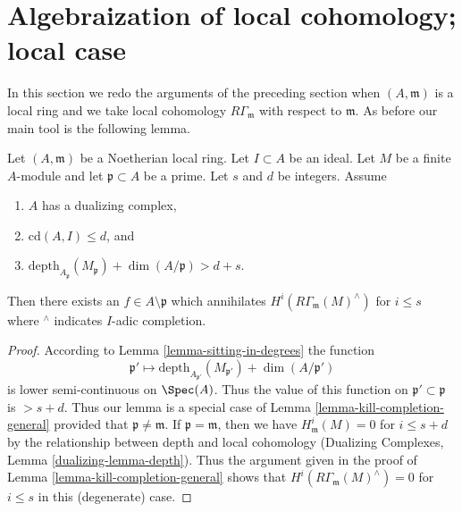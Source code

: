 \section{Algebraization of local cohomology; local case}
\label{section-algebraization-punctured}

\noindent
In this section we redo the arguments of the preceding section
when $(A, \mathfrak m)$ is a local ring and we take local cohomology
$R\Gamma_\mathfrak m$ with respect to $\mathfrak m$. As before our
main tool is the following lemma.

\begin{lemma}
\label{lemma-kill-completion}
Let $(A, \mathfrak m)$ be a Noetherian local ring.
Let $I \subset A$ be an ideal. Let $M$ be a finite $A$-module and
let $\mathfrak p \subset A$ be a prime. Let $s$ and $d$ be integers. Assume
\begin{enumerate}
\item $A$ has a dualizing complex,
\item $\text{cd}(A, I) \leq d$, and
\item
$\text{depth}_{A_\mathfrak p}(M_\mathfrak p) + \dim(A/\mathfrak p) > d + s$.
\end{enumerate}
Then there exists an $f \in A \setminus \mathfrak p$ which annihilates
$H^i(R\Gamma_\mathfrak m(M)^\wedge)$ for $i \leq s$ where ${}^\wedge$
indicates $I$-adic completion.
\end{lemma}

\begin{proof}
According to Lemma \ref{lemma-sitting-in-degrees}
the function
$$
\mathfrak p' \longmapsto
\text{depth}_{A_{\mathfrak p'}}(M_{\mathfrak p'}) + \dim(A/\mathfrak p')
$$
is lower semi-continuous on $\Spec(A)$. Thus the value
of this function on $\mathfrak p' \subset \mathfrak p$
is $> s + d$. Thus our lemma is a special case of
Lemma \ref{lemma-kill-completion-general}
provided that $\mathfrak p \not = \mathfrak m$.
If $\mathfrak p = \mathfrak m$,
then we have $H^i_\mathfrak m(M) = 0$ for $i \leq s + d$ by
the relationship between depth and local cohomology
(Dualizing Complexes, Lemma \ref{dualizing-lemma-depth}).
Thus the argument given in the proof of
Lemma \ref{lemma-kill-completion-general}
shows that $H^i(R\Gamma_\mathfrak m(M)^\wedge) = 0$
for $i \leq s$ in this (degenerate) case.
\end{proof}

